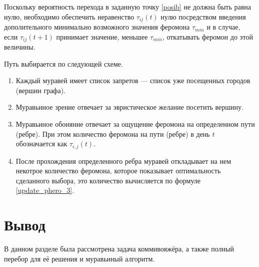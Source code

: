Поскольку вероятность перехода в заданную точку \ref{posib} не должна быть равна нулю, необходимо обеспечить неравенство $\tau_{ij} (t)$ нулю посредством введения дополительного минимально возможного значения феромона $\tau_{min}$ и в случае, если $\tau_{ij} (t+1)$ принимает значение, меньшее $\tau_{min}$, откатывать феромон до этой величины. 


Путь выбирается по следующей схеме.
\begin{enumerate}
	\item Каждый муравей имеет список запретов --- список уже посещенных городов (вершин графа).
	\item Муравьиное зрение отвечает за эвристическое желание посетить вершину.
	\item Муравьиное обоняние отвечает за ощущение феромона на определенном пути (ребре). При этом количество феромона на пути (ребре) в день $t$ обозначается как $\tau_{i, j} (t)$.
	\item После прохождения определенного ребра муравей откладывает на нем некотрое количество феромона, которое показывает оптимальность сделанного выбора, это количество вычисляется по формуле \eqref{update_phero_3}.
\end{enumerate}

\section*{Вывод}

В данном разделе была рассмотрена задача коммивояжёра, а также полный перебор для её решения и муравьиный алгоритм.